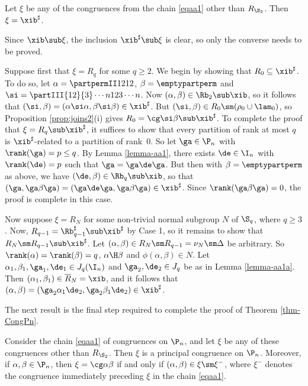 \begin{lemma}
\label{lemma-aa2}
Let $\xi$ be any of the congruences from the chain \eqref{eqaa1} other than $R_{\S_2}$.  Then $\xi=\xib^\sharp$.

\end{lemma}

\pf
Since $\xib\sub\xi$, the inclusion $\xib^\sharp\sub\xi$ is clear, so only the converse needs to be proved. 

\bigskip{} Suppose first that $\xi=R_q$ for some $q\geq 2$.  We begin by showing that $R_0\subseteq \xib^\sharp$.  To do so, let $\alpha=\partpermII1212$, $\beta=\emptypartperm$ and $\si=\partIII{12}{3}\cdots{n}{12}{3}\cdots{n}$.  Now $(\alpha,\beta)\in\Rb_2\sub\xib$, so it follows that $(\si,\beta)=(\alpha\si\alpha,\beta\si\beta)\in\xib^\sharp$.  But $(\si,\beta)\in R_0\sm(\rho_0\cup\lam_0)$, so Proposition \ref{prop:joins2}(i) gives $R_0=\cg\si\beta\sub\xib^\sharp$.  To complete the proof that $\xi=R_q\sub\xib^\sharp$, it suffices to show that every partition of rank at most $q$ is $\xib^\sharp$-related to a partition of rank~$0$.  So let $\ga\in\P_n$ with $\rank(\ga)=p\leq q$.  By Lemma \ref{lemma-aa1}, there exists $\de\in\I_n$ with $\rank(\de)=p$ such that $\ga=\ga\de\ga$.  But then with $\beta=\emptypartperm$ as above, we have $(\de,\beta)\in\Rb_q\sub\xib$, so that $(\ga,\ga\beta\ga)=(\ga\de\ga,\ga\beta\ga)\in\xib^\sharp$.  Since $\rank(\ga\beta\ga)=0$, the proof is complete in this case.

\bigskip{}  Now suppose $\xi=R_N$ for some non-trivial normal subgroup $N$ of $\S_q$, where $q\geq3$.  Now, $R_{q-1}=\Rb_{q-1}^\sharp\sub\xib^\sharp$ by Case 1, so it remains to show that $R_N\sm R_{q-1}\sub\xib^\sharp$.  
Let $(\alpha,\beta)\in R_N\sm R_{q-1}=\nu_N\sm \Delta$ be arbitrary.  So $\rank(\alpha)=\rank(\beta)=q$, $\alpha\H\beta$ and $\phi(\alpha,\beta)\in N$.  Let $\alpha_1,\beta_1,\ga_1,\de_1\in J_q(\I_n)$ and $\ga_2,\de_2\in J_q$ be as in Lemma \ref{lemma-aa1a}.  Then $(\alpha_1,\beta_1)\in \overline{R}_N=\xib$, and it follows that $(\alpha,\beta)=(\ga_2\alpha_1\de_2,\ga_2\beta_1\de_2)\in\xib^\sharp$. \epf

The next result is the final step required to complete the proof of Theorem \ref{thm-CongPn}.

%
\begin{prop}
\label{prop-aa3}
Consider the chain \eqref{eqaa1} of congruences on $\P_n$, and let $\xi$ be any of these congruences other than $R_{\S_2}$. Then $\xi$ is a principal congruence on $\P_n$.  Moreover, if $\alpha,\beta\in\P_n$, then $\xi=\cg\alpha\beta$ if and only if $(\alpha,\beta)\in\xi\sm\xi^-$, where $\xi^-$ denotes the congruence immediately preceding $\xi$ in the chain \eqref{eqaa1}.  
\end{prop}

